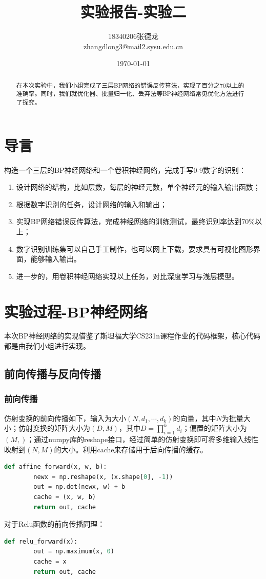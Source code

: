 \documentclass[withoutpreface,bwprint]{cumcmthesis} %
\title{实验报告-实验二}
\author{18340206张德龙 \\
	zhangdlong3@mail2.sysu.edu.cn
}
\date{\today}
\begin{document}
\maketitle
\begin{abstract}
 
 在本次实验中，我们小组完成了三层BP网络的错误反传算法，实现了百分之70以上的准确率。同时，我们就优化器、批量归一化、丢弃法等BP神经网络常见优化方法进行了探究。%
\end{abstract}

\section{导言}

构造一个三层的BP神经网络和一个卷积神经网络，完成手写0-9数字的识别：
\begin{enumerate}
\item 设计网络的结构，比如层数，每层的神经元数，单个神经元的输入输出函数；
\item 根据数字识别的任务，设计网络的输入和输出；
\item 实现BP网络错误反传算法，完成神经网络的训练测试，最终识别率达到70\%以上；
\item 数字识别训练集可以自己手工制作，也可以网上下载，要求具有可视化图形界面，能够输入输出。
\item 进一步的，用卷积神经网络实现以上任务，对比深度学习与浅层模型。
\end{enumerate}


\section{实验过程-BP神经网络}
本次BP神经网络的实现借鉴了斯坦福大学CS231n课程作业的代码框架，核心代码都是由我们小组进行实现。
\subsection{前向传播与反向传播}
\subsubsection{前向传播}
仿射变换的前向传播如下，输入为大小$(N, d_1, \cdots, d_k)$的向量，其中$N$为批量大小；仿射变换的矩阵大小为$(D, M)$，其中$D = \prod_{i=1}^{k} d_i$；偏置的矩阵大小为$(M,)$；通过numpy库的reshape接口，经过简单的仿射变换即可将多维输入线性映射到$(N, M)$的大小。利用cache来存储用于后向传播的缓存。
\begin{lstlisting}[language=python]
	def affine_forward(x, w, b):
	    newx = np.reshape(x, (x.shape[0], -1))
	    out = np.dot(newx, w) + b
	    cache = (x, w, b)
	    return out, cache
\end{lstlisting}
对于Relu函数的前向传播同理：
\begin{lstlisting}[language=python]
	def relu_forward(x):
	    out = np.maximum(x, 0)
	    cache = x
	    return out, cache
\end{lstlisting}
\end{document}
